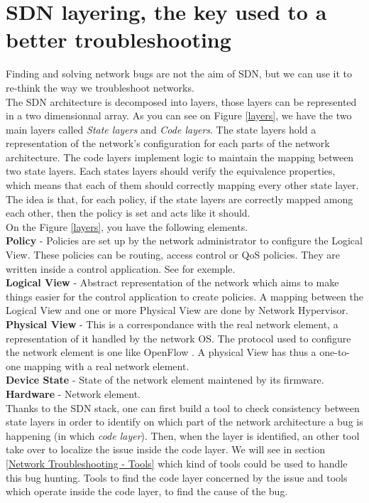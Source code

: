 \documentclass[10pt,article]{IEEEtran}
\begin{document}
\section{SDN layering, the key used to a better troubleshooting}\label{layering}
Finding and solving network bugs are not the aim of SDN, but we can use it to re-think the way we troubleshoot networks.\\ The SDN architecture is decomposed into  layers, those layers can be represented in a two dimensionnal array. As you can see on Figure \ref{layers}, we have the two main layers called \textit{State layers} and \textit{Code layers}. The state layers hold a representation of the network's configuration for each parts of the network architecture. The code layers implement logic to maintain the mapping between two state layers. Each states layers should verify the equivalence properties, which means that each of them should correctly mapping every other state layer. The idea is that, for each policy, if the state layers are correctly mapped among each other, then the policy is  set and acts like it should.\\
On the Figure \ref{layers}, you have the following elements. \\
\textbf{Policy} - Policies are set up by the network administrator to configure the Logical View. These policies can be routing, access control or QoS policies. They are written inside a control application. See \cite{...} for exemple.
\\
\textbf{Logical View} - Abstract representation of the network which aims to make things easier for the control application to create policies. A mapping between the Logical View and one or more Physical View are done by Network Hypervisor.\\
\textbf{Physical View} - This is a correspondance with the real network element, a representation of it handled by the network OS. The protocol used to configure the network element is one like OpenFlow \cite{...https://www.opennetworking.org/}. A physical View has thus a one-to-one mapping with a real network element.
\\
\textbf{Device State} - State of the network element maintened by its firmware.
\\
\textbf{Hardware} - Network element. \\

Thanks to the SDN stack, one can first build a tool to check consistency between state layers in order to identify on which part of the network architecture a bug is happening (in which \textit{code layer}). Then, when the layer is identified, an other tool take over to localize the issue inside the code layer. We will see in section \ref{Network Troubleshooting - Tools} which kind of tools could be used to handle this bug hunting. Tools to find the code layer concerned by the issue and tools which operate inside the code layer, to find the cause of the bug.
\end{document}
